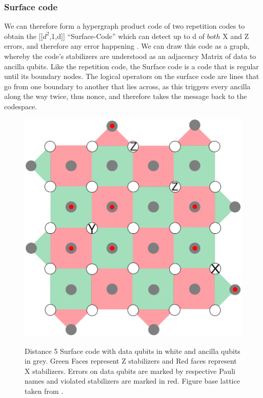 \subsubsection{Surface code}
We can therefore form a hypergraph product code of two repetition
codes to
obtain the [[$d^2$,1,d]] ``Surface-Code'' which can detect up
to d of $both$ X and Z errors, and 
therefore any error happening \cite{joschka}.
We can draw this code as a graph, whereby the code's stabilizers
are understood as an adjacency Matrix of data to ancilla qubits.
Like the repetition code, the Surface code is a code that is regular until
its boundary nodes. 
The logical operators on the surface code are lines that go from one 
boundary to another that lies across, as this triggers every ancilla along
the way twice, thus nonce, and therefore takes the message back to the
codespace.

\begin{figure}[h!]
	\begin{center}
	\captionsetup{justification=centering,margin=2cm}
	\includegraphics[scale=0.25]{./img/figures/d5surfaceCode.png}\\
	\caption{Distance 5 Surface code with data qubits in white and 
    ancilla qubits in grey. Green Faces represent Z stabilizers
    and Red faces represent X stabilizers.
    Errors on data qubits are marked
    by respective Pauli names and violated stabilizers are marked in red.
    Figure base lattice taken from \cite{surfacePic}.}
	\label{fig: surface_code}
	\end{center}
\end{figure}
